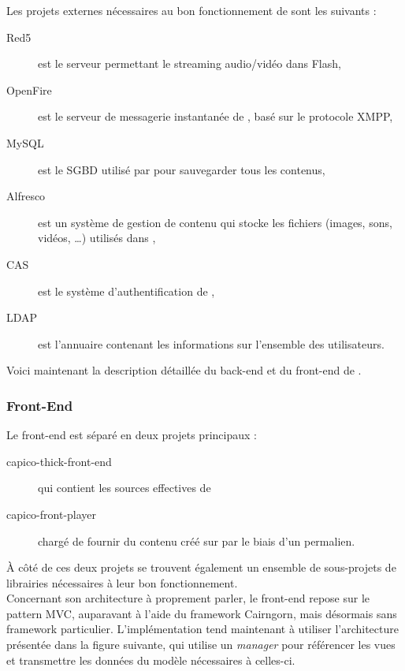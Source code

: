 Les projets externes nécessaires au bon fonctionnement de \capico{} sont les suivants :

\begin{description}
	\item[Red5] est le serveur permettant le streaming audio/vidéo dans Flash,
	\item[OpenFire] est le serveur de messagerie instantanée de \capico{}, basé sur le protocole XMPP,
	\item[MySQL] est le SGBD utilisé par \capico{} pour sauvegarder tous les contenus,
	\item[Alfresco] est un système de gestion de contenu qui stocke les fichiers (images, sons, vidéos, \dots{}) utilisés dans \capico{},
	\item[CAS] est le système d'authentification de \capico{},
	\item[LDAP] est l'annuaire contenant les informations sur l'ensemble des utilisateurs.\\
\end{description}

Voici maintenant la description détaillée du back-end et du front-end de \capico{}.

\subsubsection{Front-End}

Le front-end est séparé en deux projets principaux :

\begin{description}
	\item[capico-thick-front-end] qui contient les sources effectives de \capico{}
	\item[capico-front-player] chargé de fournir du contenu créé sur \capico{} par le biais d'un permalien.
\end{description}

À côté de ces deux projets se trouvent également un ensemble de sous-projets de librairies nécessaires à leur bon fonctionnement.\\

Concernant son architecture à proprement parler, le front-end repose sur le pattern MVC, auparavant à l'aide du framework Cairngorn, mais désormais sans framework particulier. L'implémentation tend maintenant à utiliser l'architecture présentée dans la figure suivante, qui utilise un \emph{manager} pour référencer les vues et transmettre les données du modèle nécessaires à celles-ci.

